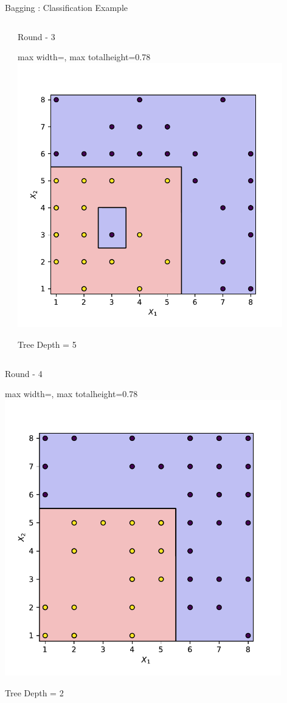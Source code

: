 \documentclass[9pt]{beamer}
\newcommand{\fitpic}[1]{\begin{adjustbox}{max width=\linewidth, max totalheight=0.78\textheight}#1\end{adjustbox}}
\begin{document}
\begin{frame}{Bagging : Classification Example}
\begin{columns}
\begin{column}{0.3\textwidth}
    \end{column}
    \pause  \begin{column}{0.3\textwidth}
      \centering
      Round - 3\\

      \fitpic{\includegraphics[width = 0.9\textwidth]{../assets/ensemble/figures/decision-boundary-2}}
      Tree Depth = 5

    \end{column}

  \end{columns}
  \vspace{0.5cm}
  \pause  \begin{columns}
    \begin{column}{0.3\textwidth}
      \centering
      Round - 4\\

      \fitpic{\includegraphics[width = 0.9\textwidth]{../assets/ensemble/figures/decision-boundary-3}}
      Tree Depth = 2


\end{column}
\end{columns}
\end{frame}
\end{document}
